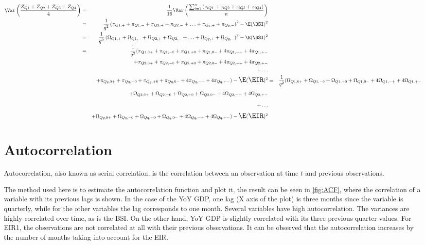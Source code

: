 \documentclass{article}[]
\begin{document}
\begin{eqnarray}
    \Var \left(\frac{Z_{Q1} + Z_{Q2} + Z_{Q3} + Z_{Q4}}{4} \right) 
    &=& \frac{1}{16} \Var \left(\frac{\sum_{i=1}^n \left(z_{i Q1} + z_{i Q2} + z_{i Q3} + z_{i Q4} \right)}{n} \right) \nonumber \\
            &=& \frac{1}{q^2} \left( \pi_{Q1,+} + \pi_{Q1,-} + \pi_{Q2,+} + \pi_{Q2,-} + \ldots + \pi_{Qq,+} + \pi_{Qq,-} \right)^2 - \E (\BSI)^2 \nonumber \\ 
&=& \frac{1}{q^2} \left( \Omega_{Q1,+} + \Omega_{Q1,-} + \Omega_{Q2,+} + \Omega_{Q2,-} + \ldots + \Omega_{Qq,+} + \Omega_{Qq,-} \right)^2 - \E (\BSI)^2 \nonumber \\ 
        &=& \frac{1}{q^2} \Large( \pi_{Q1,0+} + \pi_{Q1,-0} + \pi_{Q1,+0} + \pi_{Q1,0-} +4\pi_{Q1,-+} +4\pi_{Q1,+-} \nonumber \\ 
        && + \pi_{Q2,0+} + \pi_{Q2,-0} + \pi_{Q2,+0} + \pi_{Q2,0-} +4\pi_{Q2,-+} +4\pi_{Q2,+-} \nonumber \\ 
        &&  + \ldots \nonumber \\ 
        && + \pi_{Qq,0+} + \pi_{Qq,-0} + \pi_{Qq,+0} + \pi_{Qq,0-} +4\pi_{Qq,-+} +4\pi_{Qq,+-} \Large) - \E (\EIR)^2 
                &=& \frac{1}{q^2} \Large( \Omega_{Q1,0+} + \Omega_{Q1,-0} + \Omega_{Q1,+0} + \Omega_{Q1,0-} +4\Omega_{Q1,-+} +4\Omega_{Q1,+-} \nonumber \\ 
        && + \Omega_{Q2,0+} + \Omega_{Q2,-0} + \Omega_{Q2,+0} + \Omega_{Q2,0-} +4\Omega_{Q2,-+} +4\Omega_{Q2,+-} \nonumber \\ 
        &&  + \ldots \nonumber \\ 
        && + \Omega_{Qq,0+} + \Omega_{Qq,-0} + \Omega_{Qq,+0} + \Omega_{Qq,0-} +4\Omega_{Qq,-+} +4\Omega_{Qq,+-} \Large) - \E (\EIR)^2
\end{eqnarray}



\section{Autocorrelation}

Autocorrelation, also known as serial correlation, is the correlation between an observation at time $t$ and previous observations.

The method used here is to estimate the autocorrelation function and plot it, the result can be seen in \autoref{fig:ACF}, where the correlation of a variable with its previous lags is shown. 
In the case of the YoY GDP, one lag (X axis of the plot) is three months since the variable is quarterly, while for the other variables the lag corresponds to one month.
Several variables have high autocorrelation. The variances are highly correlated over time, as is the BSI. 
On the other hand, YoY GDP is slightly correlated with its three previous quarter values. 
For EIR1, the observations are not correlated at all with their previous observations. It can be observed that the autocorrelation increases by the number of months taking into account for the EIR.
\end{document}

